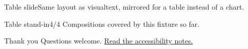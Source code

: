 \begin{frame}
\begin{tableslide}[right]{Table slide}{Same layout as visualtext, mirrored for a
table instead of a chart.}
\begin{metric}{Table stand-in}{4/4}
Compositions covered by this fixture so far.
\end{metric}
\end{tableslide}
\end{frame}

\begin{frame}
\begin{architectureslide}
\begin{diagram}[
  type=layer,
  caption={Full-bleed variant.},
  description={Two stacked layers.}
]
\end{diagram}
\end{architectureslide}
\end{frame}

\begin{frame}[plain]
\begin{closingslide}{Thank you}
Questions welcome. \href{https://reportkit.example/accessibility}{Read the accessibility notes.}
\end{closingslide}
\end{frame}


